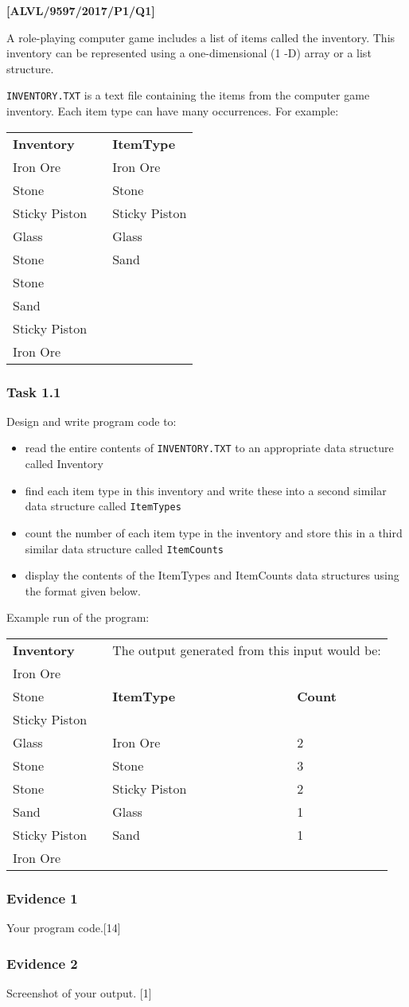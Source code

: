 \item \textbf{{[}ALVL/9597/2017/P1/Q1{]} }

A role-playing computer game includes a list of items called the inventory.
This inventory can be represented using a one-dimensional (1 -D) array
or a list structure. 

\texttt{INVENTORY.TXT} is a text file containing the items from the
computer game inventory. Each item type can have many occurrences.
For example: 

\begin{tabular}{lll}
\textbf{Inventory} &  & \textbf{ItemType}\tabularnewline
Iron Ore &  & Iron Ore\tabularnewline
Stone &  & Stone\tabularnewline
Sticky Piston &  & Sticky Piston\tabularnewline
Glass &  & Glass \tabularnewline
Stone &  & Sand \tabularnewline
Stone &  & \tabularnewline
Sand &  & \tabularnewline
Sticky Piston &  & \tabularnewline
Iron Ore &  & \tabularnewline
\end{tabular}

\subsubsection*{Task 1.1}

Design and write program code to: 
\begin{itemize}
\item read the entire contents of \texttt{INVENTORY.TXT} to an appropriate
data structure called Inventory 
\item find each item type in this inventory and write these into a second
similar data structure called \texttt{ItemTypes} 
\item count the number of each item type in the inventory and store this
in a third similar data structure called \texttt{ItemCounts }
\item display the contents of the ItemTypes and ItemCounts data structures
using the format given below. 
\end{itemize}
Example run of the program: 

\begin{tabular}{lllll}
\textbf{Inventory} &  & \multicolumn{3}{l}{The output generated from this input would be:}\tabularnewline
Iron Ore &  &  &  & \tabularnewline
Stone &  & \textbf{ItemType} &  & \textbf{Count}\tabularnewline
Sticky Piston &  &  &  & \tabularnewline
Glass &  & Iron Ore &  & 2\tabularnewline
Stone &  & Stone &  & 3\tabularnewline
Stone &  & Sticky Piston &  & 2\tabularnewline
Sand &  & Glass &  & 1\tabularnewline
Sticky Piston &  & Sand &  & 1\tabularnewline
Iron Ore &  &  &  & \tabularnewline
\end{tabular}

\subsubsection*{Evidence 1}

Your program code.\hfill{}{[}14{]}

\subsubsection*{Evidence 2}

Screenshot of your output. \hfill{}{[}1{]}